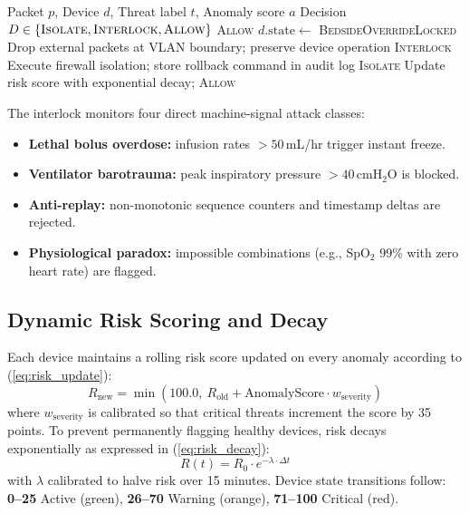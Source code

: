 \documentclass[conference]{IEEEtran}
\begin{document}
\begin{algorithm}[t]
\caption{Cyber-Physical Safety Interlock Enforcement}
\label{alg:interlock}
\begin{algorithmic}[1]
\Require Packet $p$, Device $d$, Threat label $t$, Anomaly score $a$
\Ensure Decision $D \in \{\textsc{Isolate}, \textsc{Interlock}, \textsc{Allow}\}$
 \Return \textsc{Allow}
\EndIf
{}
    \State $d.\text{state} \leftarrow $ \textsc{BedsideOverrideLocked}
    \State Drop external packets at VLAN boundary; preserve device operation
    \State \Return \textsc{Interlock}
    \State Execute firewall isolation; store rollback command in audit log
    \State \Return \textsc{Isolate}
\Else
    \State Update risk score with exponential decay; \Return \textsc{Allow}
\EndIf
\end{algorithmic}
\end{algorithm}

The interlock monitors four direct machine-signal attack classes:
\begin{itemize}
    \item \textbf{Lethal bolus overdose:} infusion rates $> 50$\,mL/hr trigger instant freeze.
    \item \textbf{Ventilator barotrauma:} peak inspiratory pressure $> 40$\,cmH$_2$O is blocked.
    \item \textbf{Anti-replay:} non-monotonic sequence counters and timestamp deltas are rejected.
    \item \textbf{Physiological paradox:} impossible combinations (e.g., SpO$_2$ 99\% with zero heart rate) are flagged.
\end{itemize}

\subsection{Dynamic Risk Scoring and Decay}
Each device maintains a rolling risk score updated on every anomaly according to (\ref{eq:risk_update}):
\begin{equation}
R_{\text{new}} = \min\!\left(100.0,\ R_{\text{old}} + \text{AnomalyScore} \cdot w_{\text{severity}}\right)
\label{eq:risk_update}
\end{equation}
where $w_{\text{severity}}$ is calibrated so that critical threats increment the score by 35 points. To prevent permanently flagging healthy devices, risk decays exponentially as expressed in (\ref{eq:risk_decay}):
\begin{equation}
R(t) = R_0 \cdot e^{-\lambda \cdot \Delta t}
\label{eq:risk_decay}
\end{equation}
with $\lambda$ calibrated to halve risk over 15 minutes. Device state transitions follow: \textbf{0--25} Active (green), \textbf{26--70} Warning (orange), \textbf{71--100} Critical (red).
\end{document}
